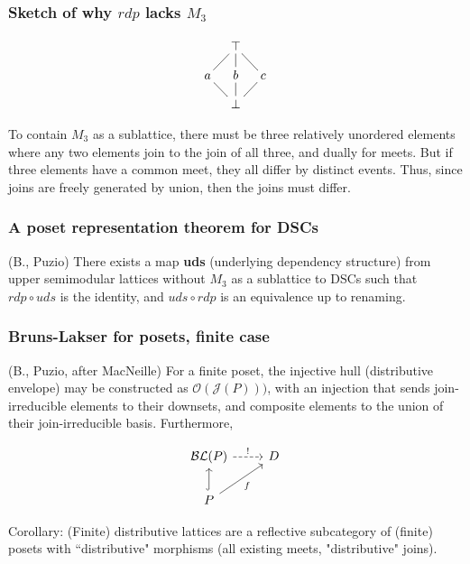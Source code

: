 \documentclass{beamer}
\newcommand{\Oc}{\mathcal{O}}
\newcommand{\Jc}{\mathcal{J}}
\newcommand{\BLc}{\mathcal{BL}}
\begin{document}
\begin{frame}[fragile]
\frametitle{Sketch of why \(rdp\) lacks \(M_3\)}
\begin{figure}
\begin{equation*}
    \xymatrix@=1em{& \top \ar@{-}[dl] \ar@{-}[d] \ar@{-}[dr] & \\
      a \ar@{-}[dr] & b \ar@{-}[d] & c \ar@{-}[dl]  \\
       & \bot &}
\end{equation*}
\end{figure}
To contain \(M_3\) as a sublattice, there must be three relatively unordered elements where any two elements join to the join of all three, and dually for meets. But if three elements have a common meet, they all differ by distinct events. Thus, since joins are freely generated by union, then the joins must differ.
\end{frame}

\begin{frame}
\frametitle{A poset representation theorem for DSCs}
\begin{theorem}
(B., Puzio) There exists a map \textbf{uds} (underlying dependency structure) from upper semimodular lattices without \(M_3\) as a sublattice to DSCs such that  \(rdp \circ uds\) is the identity, and \(uds \circ rdp\) is an equivalence up to renaming.
\end{theorem}
\end{frame}


\begin{frame}[fragile]
\frametitle{Bruns-Lakser for posets, finite case}

\begin{theorem}
(B., Puzio, after MacNeille) For a finite poset, the injective hull (distributive envelope) may be constructed as \(\Oc(\Jc(P)))\), with an injection that sends join-irreducible elements to their downsets, and composite elements to the union of their join-irreducible basis. Furthermore,

\begin{equation*}
\begin{tikzcd}
\BLc(P) \arrow[r, "!",dashed]            & D \\
P \arrow[u, hook] \arrow[ru, "f"'] &
\end{tikzcd}
\end{equation*}

\end{theorem}

Corollary: (Finite) distributive lattices are a reflective subcategory of (finite) posets with ``distributive" morphisms (all existing meets, "distributive" joins).
\end{frame}
\end{document}

